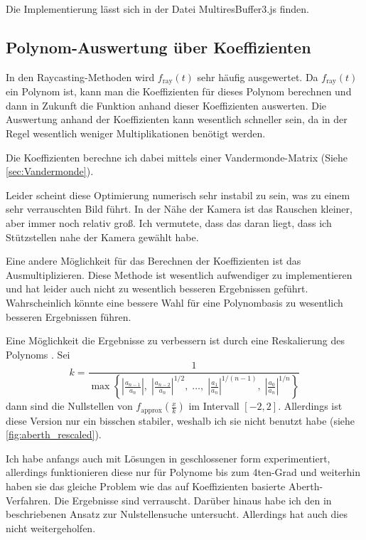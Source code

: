 \documentclass[
	ngerman,%
	accentcolor=9c,%
	ruledheaders=section,%
	class=report,%
	thesis={type=bachelor},%
	fontsize=11pt,%
	parskip=half-,%
	custommargins=true,%
	marginpar=false,%
]{tudapub}
\begin{document}
Die Implementierung lässt sich in der Datei MultiresBuffer3.js finden.




\subsection{Polynom-Auswertung über Koeffizienten}
\label{sec:Auswertung_über_Koeffizienten}
In den Raycasting-Methoden wird \( f_{\text{ray}}(t) \) sehr häufig ausgewertet. Da \( f_{\text{ray}}(t) \) ein Polynom ist, kann man die Koeffizienten für dieses Polynom berechnen und dann in Zukunft die Funktion anhand dieser Koeffizienten auswerten. Die Auswertung anhand der Koeffizienten kann wesentlich schneller sein, da in der Regel wesentlich weniger Multiplikationen benötigt werden.

Die Koeffizienten berechne ich dabei mittels einer Vandermonde-Matrix (Siehe \ref{sec:Vandermonde}).  

Leider scheint diese Optimierung numerisch sehr instabil zu sein, was zu einem sehr verrauschten Bild führt. In der Nähe der Kamera ist das Rauschen kleiner, aber immer noch relativ groß. Ich vermutete, dass das daran liegt, dass ich Stützstellen nahe der Kamera gewählt habe.

Eine andere Möglichkeit für das Berechnen der Koeffizienten ist das Ausmultiplizieren. Diese Methode ist wesentlich aufwendiger zu implementieren und hat leider auch nicht zu wesentlich besseren Ergebnissen geführt.  Wahrscheinlich könnte eine bessere Wahl für eine Polynombasis zu wesentlich besseren Ergebnissen führen.


Eine Möglichkeit die Ergebnisse zu verbessern ist durch eine Reskalierung des Polynoms \cite{flocke2015algorithm954}. 
Sei 
\[
k = \frac{1}{\max\left\{ |\frac{a_{n-1}}{a_n}|,\; |\frac{a_{n-2}}{a_n}|^{1/2},\; \dots,\; |\frac{a_{1}}{a_n}|^{1/(n-1)},\; |\frac{a_{0}}{a_n}|^{1/n} \right\}}
\]
dann sind die Nullstellen von \(f_\text{approx}(\frac{x}{k})\) im Intervall \([-2,2]\). Allerdings ist diese Version nur ein bisschen stabiler, weshalb ich sie nicht benutzt habe (siehe \ref{fig:aberth_rescaled}). 


Ich habe anfangs auch mit Lösungen in geschlossener form experimentiert, allerdings funktionieren diese nur für Polynome bis zum 4ten-Grad und weiterhin haben sie das gleiche Problem wie das auf Koeffizienten basierte Aberth-Verfahren. Die Ergebnisse sind verrauscht.
Darüber hinaus habe ich den in \cite{peters2023gpuPolynomialRoots} beschriebenen Ansatz zur Nulstellensuche untersucht. Allerdings hat auch dies nicht weitergeholfen.
\end{document}
